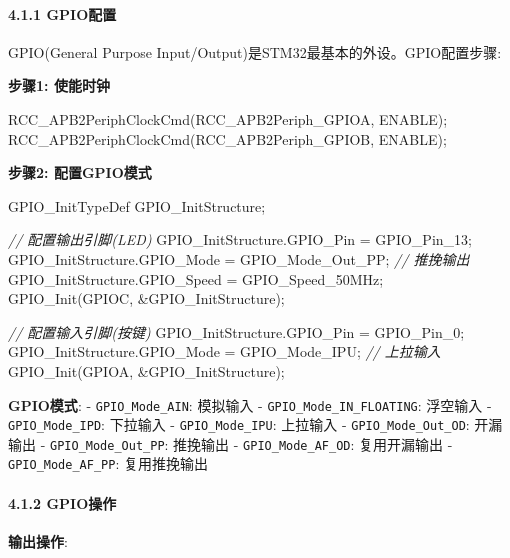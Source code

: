 \documentclass[
]{article}
\newenvironment{Shaded}{}{}
\newcommand{\CommentTok}[1]{\textcolor[rgb]{0.38,0.63,0.69}{\textit{#1}}}
\newcommand{\NormalTok}[1]{#1}
\begin{document}
\hypertarget{gpioux914dux7f6e}{%
\paragraph{4.1.1 GPIO配置}\label{gpioux914dux7f6e}}

GPIO(General Purpose Input/Output)是STM32最基本的外设。GPIO配置步骤:

\textbf{步骤1: 使能时钟}

\begin{Shaded}
\begin{Highlighting}[]
\NormalTok{RCC\_APB2PeriphClockCmd(RCC\_APB2Periph\_GPIOA, ENABLE);}
\NormalTok{RCC\_APB2PeriphClockCmd(RCC\_APB2Periph\_GPIOB, ENABLE);}
\end{Highlighting}
\end{Shaded}

\textbf{步骤2: 配置GPIO模式}

\begin{Shaded}
\begin{Highlighting}[]
\NormalTok{GPIO\_InitTypeDef GPIO\_InitStructure;}

\CommentTok{// 配置输出引脚(LED)}
\NormalTok{GPIO\_InitStructure.GPIO\_Pin = GPIO\_Pin\_13;}
\NormalTok{GPIO\_InitStructure.GPIO\_Mode = GPIO\_Mode\_Out\_PP;     }\CommentTok{// 推挽输出}
\NormalTok{GPIO\_InitStructure.GPIO\_Speed = GPIO\_Speed\_50MHz;}
\NormalTok{GPIO\_Init(GPIOC, \&GPIO\_InitStructure);}

\CommentTok{// 配置输入引脚(按键)}
\NormalTok{GPIO\_InitStructure.GPIO\_Pin = GPIO\_Pin\_0;}
\NormalTok{GPIO\_InitStructure.GPIO\_Mode = GPIO\_Mode\_IPU;        }\CommentTok{// 上拉输入}
\NormalTok{GPIO\_Init(GPIOA, \&GPIO\_InitStructure);}
\end{Highlighting}
\end{Shaded}

\textbf{GPIO模式}: - \texttt{GPIO\_Mode\_AIN}: 模拟输入 -
\texttt{GPIO\_Mode\_IN\_FLOATING}: 浮空输入 - \texttt{GPIO\_Mode\_IPD}:
下拉输入 - \texttt{GPIO\_Mode\_IPU}: 上拉输入 -
\texttt{GPIO\_Mode\_Out\_OD}: 开漏输出 - \texttt{GPIO\_Mode\_Out\_PP}:
推挽输出 - \texttt{GPIO\_Mode\_AF\_OD}: 复用开漏输出 -
\texttt{GPIO\_Mode\_AF\_PP}: 复用推挽输出

\hypertarget{gpioux64cdux4f5c}{%
\paragraph{4.1.2 GPIO操作}\label{gpioux64cdux4f5c}}

\textbf{输出操作}:
\end{document}
